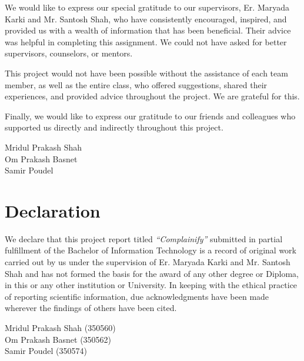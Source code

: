 \documentclass[12pt,a4paper]{report}
\begin{document}
We would like to express our special gratitude to our supervisors, Er. Maryada Karki and Mr. Santosh Shah, who have consistently encouraged, inspired, and provided us with a wealth of information that has been beneficial. Their advice was helpful in completing this assignment. We could not have asked for better supervisors, counselors, or mentors.

This project would not have been possible without the assistance of each team member, as well as the entire class, who offered suggestions, shared their experiences, and provided advice throughout the project. We are grateful for this.

Finally, we would like to express our gratitude to our friends and colleagues who supported us directly and indirectly throughout this project.

\vspace{2cm}
\begin{flushright}
Mridul Prakash Shah\\
Om Prakash Basnet\\
Samir Poudel
\end{flushright}

\chapter*{Declaration}

We declare that this project report titled \textit{``Complainify''} submitted in partial fulfillment of the Bachelor of Information Technology is a record of original work carried out by us under the supervision of Er. Maryada Karki and Mr. Santosh Shah and has not formed the basis for the award of any other degree or Diploma, in this or any other institution or University. In keeping with the ethical practice of reporting scientific information, due acknowledgments have been made wherever the findings of others have been cited.

\vspace{2cm}
\begin{flushright}
Mridul Prakash Shah (350560)\\
Om Prakash Basnet (350562)\\
Samir Poudel (350574)
\end{flushright}

\end{document}
